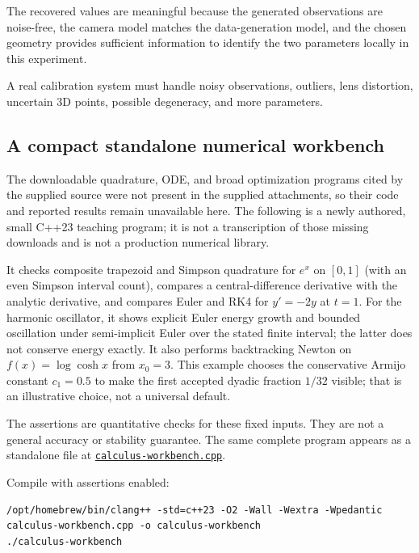 The recovered values are meaningful because the generated observations are noise-free, the camera model matches the data-generation model, and the chosen geometry provides sufficient information to identify the two parameters locally in this experiment.

A real calibration system must handle noisy observations, outliers, lens distortion, uncertain 3D points, possible degeneracy, and more parameters.

\subsection{A compact standalone numerical workbench}\label{02-foundations-ii-ch028-a-compact-standalone-numerical-workbench}

The downloadable quadrature, ODE, and broad optimization programs cited by the supplied source were not present in the supplied attachments, so their code and reported results remain unavailable here. The following is a newly authored, small C++23 teaching program; it is not a transcription of those missing downloads and is not a production numerical library.

It checks composite trapezoid and Simpson quadrature for \(e^x\) on \([0,1]\) (with an even Simpson interval count), compares a central-difference derivative with the analytic derivative, and compares Euler and RK4 for \(y'=-2y\) at \(t=1\). For the harmonic oscillator, it shows explicit Euler energy growth and bounded oscillation under semi-implicit Euler over the stated finite interval; the latter does not conserve energy exactly. It also performs backtracking Newton on \(f(x)=\log\cosh x\) from \(x_0=3\). This example chooses the conservative Armijo constant \(c_1=0.5\) to make the first accepted dyadic fraction \(1/32\) visible; that is an illustrative choice, not a universal default.

The assertions are quantitative checks for these fixed inputs. They are not a general accuracy or stability guarantee. The same complete program appears as a standalone file at \hyperref[source-file-5437fab757464f3d8cb2452f]{\texttt{calculus-workbench.cpp}}.

Compile with assertions enabled:

\begin{verbatim}
/opt/homebrew/bin/clang++ -std=c++23 -O2 -Wall -Wextra -Wpedantic calculus-workbench.cpp -o calculus-workbench
./calculus-workbench
\end{verbatim}

